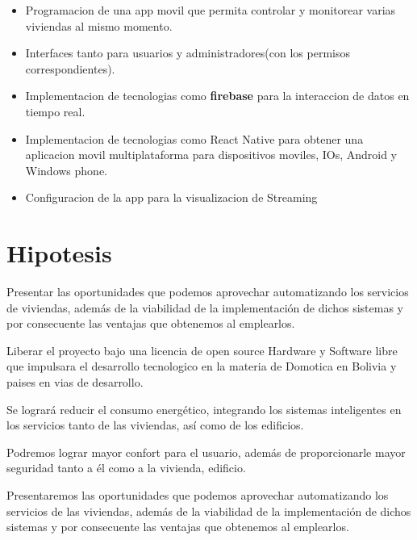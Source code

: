 \documentclass[letterpaper,12pt]{article}
\begin{document}
{\begin{itemize}
			\item Programacion de una app movil que permita controlar y monitorear varias viviendas al mismo momento. 
			
			\item Interfaces tanto para usuarios y administradores(con los permisos correspondientes).
			
			\item Implementacion de tecnologias como \textbf{firebase} para la interaccion de datos en tiempo real.
			
			\item Implementacion de tecnologias como React Native  para obtener una aplicacion movil multiplataforma para dispositivos moviles, IOs, Android y Windows phone.
			
			
			\item Configuracion de la app para la visualizacion de Streaming 
			
		\end{itemize}
		
		
		
		
		\section{Hipotesis}
		
		Presentar las oportunidades que podemos aprovechar automatizando los servicios de viviendas, además de la viabilidad de la implementación de dichos sistemas y por consecuente las ventajas que obtenemos al emplearlos.
		
		Liberar el proyecto bajo una licencia de open source Hardware y Software libre que impulsara el desarrollo tecnologico en la materia de Domotica en Bolivia y paises en vias de desarrollo.
		
		Se logrará reducir el consumo energético, integrando los sistemas inteligentes en los servicios tanto de las viviendas, así como de los edificios.
		
		Podremos lograr mayor confort para el usuario, además de proporcionarle mayor seguridad tanto a él como a la vivienda, edificio.
		
		Presentaremos las oportunidades que podemos aprovechar automatizando los servicios de las viviendas, además de la viabilidad de la implementación de dichos sistemas y por consecuente las ventajas que obtenemos al emplearlos.
		
}
\end{document}
